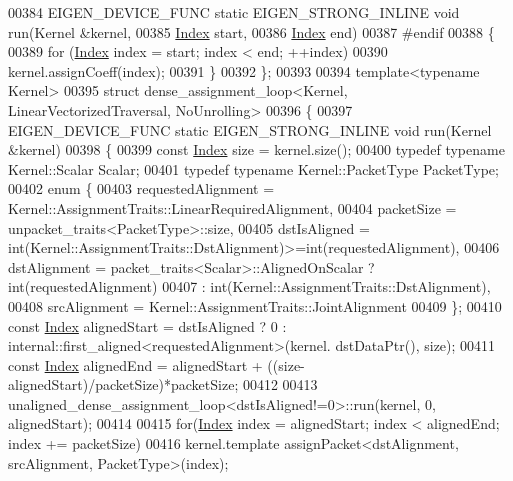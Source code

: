 \begin{DoxyCode}
00384   EIGEN\_DEVICE\_FUNC \textcolor{keyword}{static} EIGEN\_STRONG\_INLINE \textcolor{keywordtype}{void} run(Kernel &kernel,
00385                                       \hyperlink{namespace_eigen_a62e77e0933482dafde8fe197d9a2cfde}{Index} start,
00386                                       \hyperlink{namespace_eigen_a62e77e0933482dafde8fe197d9a2cfde}{Index} end)
00387 \textcolor{preprocessor}{#endif}
00388   \{
00389     \textcolor{keywordflow}{for} (\hyperlink{namespace_eigen_a62e77e0933482dafde8fe197d9a2cfde}{Index} index = start; index < end; ++index)
00390       kernel.assignCoeff(index);
00391   \}
00392 \};
00393 
00394 \textcolor{keyword}{template}<\textcolor{keyword}{typename} Kernel>
00395 \textcolor{keyword}{struct }dense\_assignment\_loop<Kernel, LinearVectorizedTraversal, NoUnrolling>
00396 \{
00397   EIGEN\_DEVICE\_FUNC \textcolor{keyword}{static} EIGEN\_STRONG\_INLINE \textcolor{keywordtype}{void} run(Kernel &kernel)
00398   \{
00399     \textcolor{keyword}{const} \hyperlink{namespace_eigen_a62e77e0933482dafde8fe197d9a2cfde}{Index} size = kernel.size();
00400     \textcolor{keyword}{typedef} \textcolor{keyword}{typename} Kernel::Scalar Scalar;
00401     \textcolor{keyword}{typedef} \textcolor{keyword}{typename} Kernel::PacketType PacketType;
00402     \textcolor{keyword}{enum} \{
00403       requestedAlignment = Kernel::AssignmentTraits::LinearRequiredAlignment,
00404       packetSize = unpacket\_traits<PacketType>::size,
00405       dstIsAligned = int(Kernel::AssignmentTraits::DstAlignment)>=int(requestedAlignment),
00406       dstAlignment = packet\_traits<Scalar>::AlignedOnScalar ? int(requestedAlignment)
00407                                                             : int(Kernel::AssignmentTraits::DstAlignment),
00408       srcAlignment = Kernel::AssignmentTraits::JointAlignment
00409     \};
00410     \textcolor{keyword}{const} \hyperlink{namespace_eigen_a62e77e0933482dafde8fe197d9a2cfde}{Index} alignedStart = dstIsAligned ? 0 : internal::first\_aligned<requestedAlignment>(kernel.
      dstDataPtr(), size);
00411     \textcolor{keyword}{const} \hyperlink{namespace_eigen_a62e77e0933482dafde8fe197d9a2cfde}{Index} alignedEnd = alignedStart + ((size-alignedStart)/packetSize)*packetSize;
00412 
00413     unaligned\_dense\_assignment\_loop<dstIsAligned!=0>::run(kernel, 0, alignedStart);
00414 
00415     \textcolor{keywordflow}{for}(\hyperlink{namespace_eigen_a62e77e0933482dafde8fe197d9a2cfde}{Index} index = alignedStart; index < alignedEnd; index += packetSize)
00416       kernel.template assignPacket<dstAlignment, srcAlignment, PacketType>(index);

\end{DoxyCode}
